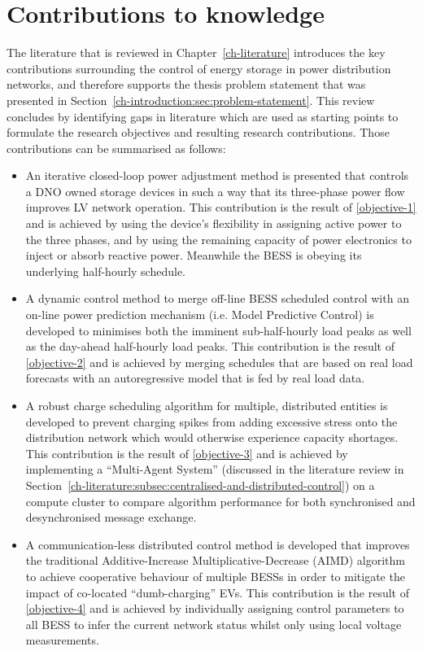 \section{Contributions to knowledge}
\label{ch-introduction:sec:contributions}

The literature that is reviewed in Chapter~\ref{ch-literature} introduces the key contributions surrounding the control of energy storage in power distribution networks, and therefore supports the thesis problem statement that was presented in Section~\ref{ch-introduction:sec:problem-statement}.
This review concludes by identifying gaps in literature which are used as starting points to formulate the research objectives and resulting research contributions.
Those contributions can be summarised as follows:

\begin{itemize}
	\item
	An iterative closed-loop power adjustment method is presented that controls a DNO owned storage devices in such a way that its three-phase power flow improves LV network operation.
	This contribution is the result of \ref{objective-1} and is achieved by using the device's flexibility in assigning active power to the three phases, and by using the remaining capacity of power electronics to inject or absorb reactive power.
	Meanwhile the BESS is obeying its underlying half-hourly schedule.
	\item
	A dynamic control method to merge off-line BESS scheduled control with an on-line power prediction mechanism (i.e. Model Predictive Control) is developed to minimises both the imminent sub-half-hourly load peaks as well as the day-ahead half-hourly load peaks.
	This contribution is the result of \ref{objective-2} and is achieved by merging schedules that are based on real load forecasts with an autoregressive model that is fed by real load data.
	\item
	A robust charge scheduling algorithm for multiple, distributed entities is developed to prevent charging spikes from adding excessive stress onto the distribution network which would otherwise experience capacity shortages.
	This contribution is the result of \ref{objective-3} and is achieved by implementing a ``Multi-Agent System'' (discussed in the literature review in Section~\ref{ch-literature:subsec:centralised-and-distributed-control}) on a compute cluster to compare algorithm performance for both synchronised and desynchronised message exchange.
	\item
	A communication-less distributed control method is developed that improves the traditional Additive-Increase Multiplicative-Decrease (AIMD) algorithm to achieve cooperative behaviour of multiple BESSs in order to mitigate the impact of co-located ``dumb-charging'' EVs.
	This contribution is the result of \ref{objective-4} and is achieved by individually assigning control parameters to all BESS to infer the current network status whilst only using local voltage measurements.
\end{itemize}
